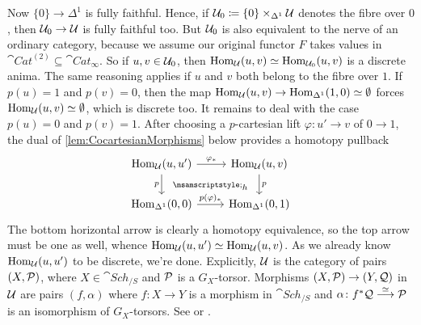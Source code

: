 \begin{numpar}
{	Now $\{0\}\rightarrow \Delta^1$ is fully faithful. Hence, if $\mathcal{U}_0\coloneqq \{0\}\times_{\Delta^1}\mathcal{U}$ denotes the fibre over $0$, then $\mathcal{U}_0\rightarrow \mathcal{U}$ is fully faithful too. But $\mathcal{U}_0$ is also equivalent to the nerve of an ordinary category, because we assume our original functor $F$ takes values in $\cat{Cat}^{(2)}\subseteq \cat{Cat}_\infty$. So if $u,v\in \mathcal{U}_0$, then $\operatorname{Hom}_{\mathcal{U}}(u,v)\simeq \operatorname{Hom}_{\mathcal{U}_0}(u,v)$ is a discrete anima. The same reasoning applies if $u$ and $v$ both belong to the fibre over $1$. If $p(u)=1$ and $p(v)=0$, then the map $\operatorname{Hom}_{\mathcal{U}}(u,v)\rightarrow \operatorname{Hom}_{\Delta^1}(1,0)\simeq\emptyset$ forces $\operatorname{Hom}_{\mathcal{U}}(u,v)\simeq \emptyset$, which is discrete too. It remains to deal with the case $p(u)=0$ and $p(v)=1$. After choosing a $p$-cartesian lift $\varphi\colon u'\rightarrow v$ of $0\rightarrow 1$, the dual of \cref{lem:CocartesianMorphisms} below provides a homotopy pullback
	\begin{equation*}
		\begin{tikzcd}[ampersand replacement=\&]
			\Hom_\Uu(u,u')\rar["\varphi_*"] \dar["p"']\drar[dash, phantom, "\scriptstyle\rlap{\phantom{$\pullbacksign$}}\smash{\pullbacksign_{\scriptstyle h}}", start anchor=center, end anchor=center] \& \Hom_\Uu(u,v)\dar["p"]\\
			\Hom_{\Delta^1}(0,0)\rar["{p(\varphi)_*}"] \& \Hom_{\Delta^1}(0,1)
		\end{tikzcd}
	\end{equation*}
	The bottom horizontal arrow is clearly a homotopy equivalence, so the top arrow must be one as well, whence $\operatorname{Hom}_{\mathcal{U}}(u,u')\simeq \operatorname{Hom}_{\mathcal{U}}(u,v)$. As we already know $\operatorname{Hom}_{\mathcal{U}}(u,u')$ to be discrete, we're done.}
	Explicitly, $\mathcal{U}$ is the category of pairs $(X,\mathcal{P})$, where $X\in\cat{Sch}_{/S}$ and $\mathcal{P}$ is a $G_X$-torsor. Morphisms $(X,\mathcal{P})\rightarrow (Y,\mathcal{Q})$ in $\mathcal{U}$ are pairs $(f,\alpha)$ where $f\colon X\rightarrow Y$ is a morphism in $\cat{Sch}_{/S}$ and $\alpha\colon f^*\mathcal{Q}\overset{\simeq}{\longrightarrow}\mathcal{P}$ is an isomorphism of $G_X$-torsors.
	See \cite[Example~8.1.10]{OlssonStacks} or \cite[]{Stacks}.
	

\end{numpar}
